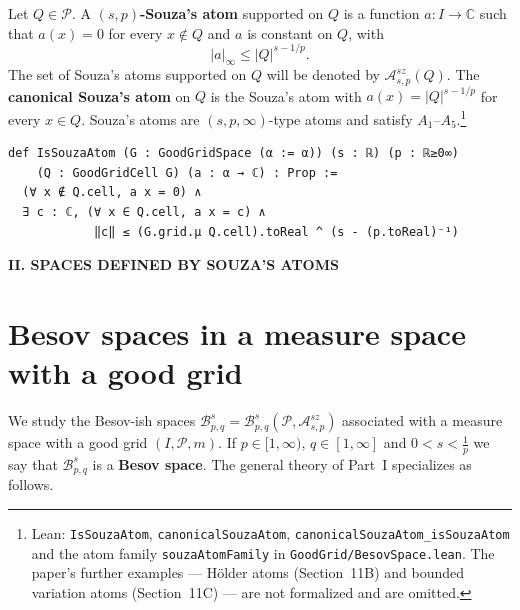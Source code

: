 \documentclass[11pt]{amsart}
\theoremstyle{definition}
\newcommand{\lean}[1]{\texttt{#1}}
\begin{document}
Let $Q\in \mathcal{P}$. A {\bf $(s,p)$-Souza's atom} supported on $Q$ is a
function $a\colon I \rightarrow \mathbb{C}$ such that $a(x)=0$ for every
$x \not\in Q$ and $a$ is constant on $Q$, with
$$|a|_\infty\leq |Q|^{s-1/p}.$$
The set of Souza's atoms supported on $Q$ will be denoted by
$\mathcal{A}^{sz}_{s,p}(Q)$. The {\bf canonical Souza's atom} on $Q$ is the
Souza's atom with $a(x)= |Q|^{s-1/p}$ for every $x \in Q$. Souza's atoms are
$(s,p,\infty)$-type atoms and satisfy $A_1$--$A_5$.\footnote{Lean:
\lean{IsSouzaAtom}, \lean{canonicalSouzaAtom},
\lean{canonicalSouzaAtom\_isSouzaAtom} and the atom family
\lean{souzaAtomFamily} in \lean{GoodGrid/BesovSpace.lean}. The paper's
further examples --- H\"older atoms (Section~11B) and bounded variation atoms
(Section~11C) --- are not formalized and are omitted.}
\begin{lstlisting}[style=lean]
def IsSouzaAtom (G : GoodGridSpace (α := α)) (s : ℝ) (p : ℝ≥0∞)
    (Q : GoodGridCell G) (a : α → ℂ) : Prop :=
  (∀ x ∉ Q.cell, a x = 0) ∧
  ∃ c : ℂ, (∀ x ∈ Q.cell, a x = c) ∧
            ‖c‖ ≤ (G.grid.μ Q.cell).toReal ^ (s - (p.toReal)⁻¹)
\end{lstlisting}

\vspace{8mm}
\centerline{\Large\bf II. SPACES DEFINED BY SOUZA'S ATOMS}
\vspace{6mm}

\begin{center}
\fbox{\begin{minipage}{0.88\textwidth}
\centering
In Part II we suppose that $s>0$, \ $p\in [1,\infty)$ \ and \
$q\in [1,\infty]$.
\end{minipage}}
\end{center}
\vspace{4mm}

\section{Besov spaces in a measure space with a good grid}\label{secbesov}

We study the Besov-ish spaces
$\mathcal{B}^s_{p,q}=\mathcal{B}^s_{p,q}(\mathcal{P},\mathcal{A}^{sz}_{s,p})$
associated with a measure space with a good grid $(I,\mathcal{P},m)$. If
$p\in [1,\infty)$, $q\in [1,\infty]$ and $0<s<\frac{1}{p}$ we say that
$\mathcal{B}^s_{p,q}$ is a {\bf Besov space}. The general theory of Part~I
specializes as follows.
\end{document}
